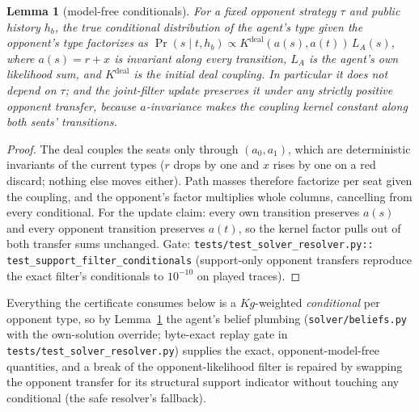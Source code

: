 \documentclass[11pt]{article}
\theoremstyle{plain}
\newtheorem{lemma}[theorem]{Lemma}
\theoremstyle{definition}
\theoremstyle{remark}
\begin{document}
\begin{lemma}[model-free conditionals]\label{lem:cond}
For a fixed opponent strategy $\tau$ and public history $h_b$, the
true conditional distribution of the agent's type given the
opponent's type factorizes as
$\Pr(s \mid t, h_b) \propto K^{\mathrm{deal}}(a(s), a(t)) \, L_A(s)$,
where $a(s) = r + x$ is invariant along every transition, $L_A$ is
the agent's own likelihood sum, and $K^{\mathrm{deal}}$ is the initial
deal coupling. In particular it does not depend on $\tau$; and the
joint-filter update preserves it under \emph{any} strictly positive
opponent transfer, because $a$-invariance makes the coupling kernel
constant along both seats' transitions.
\end{lemma}

\begin{proof}
The deal couples the seats only through $(a_0, a_1)$, which are
deterministic invariants of the current types ($r$ drops by one and
$x$ rises by one on a red discard; nothing else moves either). Path
masses therefore factorize per seat given the coupling, and the
opponent's factor multiplies whole columns, cancelling from every
conditional. For the update claim: every own transition preserves
$a(s)$ and every opponent transition preserves $a(t)$, so the kernel
factor pulls out of both transfer sums unchanged.
Gate: \texttt{tests/test\_solver\_resolver.py::%
test\_support\_filter\_conditionals} (support-only opponent transfers
reproduce the exact filter's conditionals to $10^{-10}$ on played
traces).
\end{proof}

Everything the certificate consumes below is a $K g$-weighted
\emph{conditional} per opponent type, so by Lemma~\ref{lem:cond} the
agent's belief plumbing (\texttt{solver/beliefs.py} with the
own-solution override; byte-exact replay gate in
\texttt{tests/test\_solver\_resolver.py}) supplies the exact,
opponent-model-free quantities, and a break of the opponent-likelihood
filter is repaired by swapping the opponent transfer for its
structural support indicator without touching any conditional (the
safe resolver's fallback).
\end{document}
